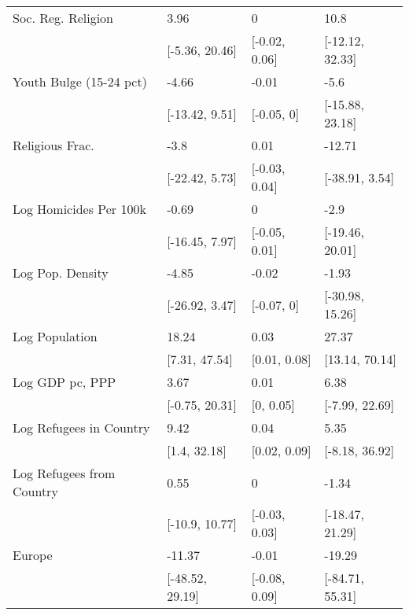 \begin{table}[ht]
\begin{tabular}{llll}
  Soc. Reg. Religion & 3.96 & 0 & 10.8 \\ 
   & [-5.36, 20.46] & [-0.02, 0.06] & [-12.12, 32.33] \\ 
  Youth Bulge (15-24 pct) & -4.66 & -0.01 & -5.6 \\ 
   & [-13.42, 9.51] & [-0.05, 0] & [-15.88, 23.18] \\ 
  Religious Frac. & -3.8 & 0.01 & -12.71 \\ 
   & [-22.42, 5.73] & [-0.03, 0.04] & [-38.91, 3.54] \\ 
  Log Homicides Per 100k & -0.69 & 0 & -2.9 \\ 
   & [-16.45, 7.97] & [-0.05, 0.01] & [-19.46, 20.01] \\ 
  Log Pop. Density & -4.85 & -0.02 & -1.93 \\ 
   & [-26.92, 3.47] & [-0.07, 0] & [-30.98, 15.26] \\ 
  Log Population & 18.24 & 0.03 & 27.37 \\ 
   & [7.31, 47.54] & [0.01, 0.08] & [13.14, 70.14] \\ 
  Log GDP pc, PPP & 3.67 & 0.01 & 6.38 \\ 
   & [-0.75, 20.31] & [0, 0.05] & [-7.99, 22.69] \\ 
  Log Refugees in Country & 9.42 & 0.04 & 5.35 \\ 
   & [1.4, 32.18] & [0.02, 0.09] & [-8.18, 36.92] \\ 
  Log Refugees from Country & 0.55 & 0 & -1.34 \\ 
   & [-10.9, 10.77] & [-0.03, 0.03] & [-18.47, 21.29] \\ 
  Europe & -11.37 & -0.01 & -19.29 \\ 
   & [-48.52, 29.19] & [-0.08, 0.09] & [-84.71, 55.31] \\ 
   \hline
\end{tabular}
\end{table}
